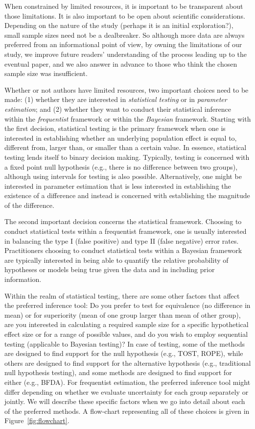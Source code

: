 \documentclass[
  english,
  man,floatsintext]{apa6}
\begin{document}
When constrained by limited resources, it is important to be transparent about those limitations. It is also important to be open about scientific considerations. Depending on the nature of the study (perhaps it is an initial exploration?), small sample sizes need not be a dealbreaker. So although more data are always preferred from an informational point of view, by owning the limitations of our study, we improve future readers' understanding of the process leading up to the eventual paper, and we also answer in advance to those who think the chosen sample size was insufficient.

Whether or not authors have limited resources, two important choices need to be made: (1) whether they are interested in \emph{statistical testing} or in \emph{parameter estimation}; and (2) whether they want to conduct their statistical inference within the \emph{frequentist} framework or within the \emph{Bayesian} framework. Starting with the first decision, statistical testing is the primary framework when one is interested in establishing whether an underlying population effect is equal to, different from, larger than, or smaller than a certain value. In essence, statistical testing lends itself to binary decision making. Typically, testing is concerned with a fixed point null hypothesis (e.g., there is no difference between two groups), although using intervals for testing is also possible. Alternatively, one might be interested in parameter estimation that is less interested in establishing the existence of a difference and instead is concerned with establishing the magnitude of the difference.

The second important decision concerns the statistical framework. Choosing to conduct statistical tests within a frequentist framework, one is usually interested in balancing the type I (false positive) and type II (false negative) error rates. Practitioners choosing to conduct statistical tests within a Bayesian framework are typically interested in being able to quantify the relative probability of hypotheses or models being true given the data and in including prior information.

Within the realm of statistical testing, there are some other factors that affect the preferred inference tool: Do you prefer to test for equivalence (no difference in mean) or for superiority (mean of one group larger than mean of other group), are you interested in calculating a required sample size for a specific hypothetical effect size or for a range of possible values, and do you wish to employ sequential testing (applicable to Bayesian testing)? In case of testing, some of the methods are designed to find support for the null hypothesis (e.g., TOST, ROPE), while others are designed to find support for the alternative hypothesis (e.g., traditional null hypothesis testing), and some methods are designed to find support for either (e.g., BFDA). For frequentist estimation, the preferred inference tool might differ depending on whether we evaluate uncertainty for each group separately or jointly. We will describe these specific factors when we go into detail about each of the preferred methods. A flow-chart representing all of these choices is given in Figure~\ref{fig:flowchart}.
\end{document}
